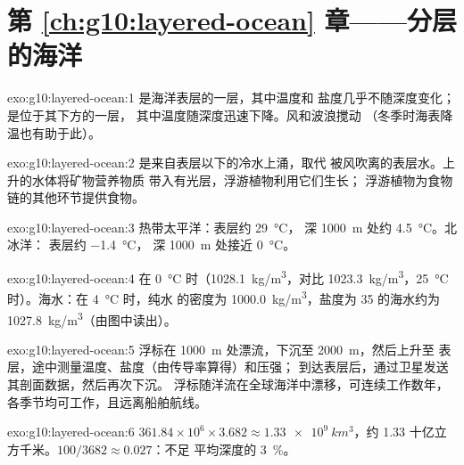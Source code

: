 \section*{第 \ref{ch:g10:layered-ocean} 章——分层的海洋}

\begin{solution}{exo:g10:layered-ocean:1}
是海洋表层的一层，其中温度和
盐度几乎不随深度变化；是位于其下方的一层，
其中温度随深度迅速下降。风和波浪搅动
（冬季时海表降温也有助于此）。
\end{solution}

\begin{solution}{exo:g10:layered-ocean:2}
是来自表层以下的冷水上涌，取代
被风吹离的表层水。上升的水体将矿物营养物质
带入有光层，浮游植物利用它们生长；
浮游植物为食物链的其他环节提供食物。
\end{solution}

\begin{solution}{exo:g10:layered-ocean:3}
热带太平洋：表层约 \qty{29}{\degreeCelsius}，
深 \qty{1000}{m} 处约 \qty{4.5}{\degreeCelsius}。北冰洋：
表层约 \qty{-1.4}{\degreeCelsius}，
深 \qty{1000}{m} 处接近 \qty{0}{\degreeCelsius}。
\end{solution}

\begin{solution}{exo:g10:layered-ocean:4}
在 \qty{0}{\degreeCelsius} 时（\qty{1028.1}{kg/m^3}，对比
\qty{1023.3}{kg/m^3}，\qty{25}{\degreeCelsius} 时）。海水：在 \qty{4}{\degreeCelsius} 时，纯水
的密度为 \qty{1000.0}{kg/m^3}，盐度为 35 的海水约为
\qty{1027.8}{kg/m^3}（由图中读出）。
\end{solution}

\begin{solution}{exo:g10:layered-ocean:5}
浮标在 \qty{1000}{m} 处漂流，下沉至 \qty{2000}{m}，然后上升至
表层，途中测量温度、盐度（由传导率算得）和压强；
到达表层后，通过卫星发送其剖面数据，然后再次下沉。
浮标随洋流在全球海洋中漂移，可连续工作数年，
各季节均可工作，且远离船舶航线。
\end{solution}

\begin{solution}{exo:g10:layered-ocean:6}
$361.84\times10^6 \times 3.682 \approx \qty{1.33e9}{km^3}$，约
\num{1.33} 十亿立方千米。$100/3682 \approx 0.027$：不足
平均深度的 \qty{3}{\percent}。
\end{solution}

